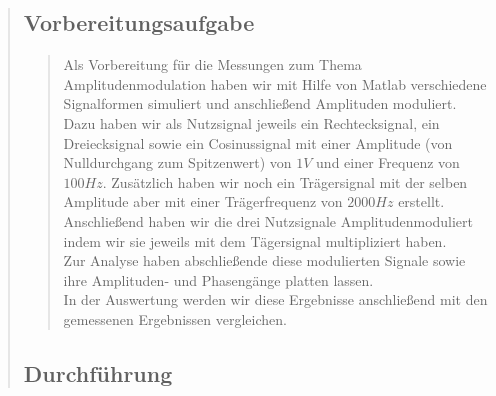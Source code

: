 \begin{quote}
\begin{quote}
\begin{quote}
		      
		\end{quote}
        
        
    \end{quote}
    
    \subsection{Vorbereitungsaufgabe}
    \begin{quote}
        Als Vorbereitung für die Messungen zum Thema Amplitudenmodulation haben wir mit Hilfe von Matlab verschiedene
        Signalformen simuliert und anschließend Amplituden moduliert.\\
        Dazu haben wir als Nutzsignal jeweils ein Rechtecksignal, ein Dreiecksignal sowie ein Cosinussignal mit
        einer Amplitude (von Nulldurchgang zum Spitzenwert) von $1V$ und einer Frequenz von $100 Hz$. Zusätzlich haben
        wir noch ein Trägersignal mit der selben Amplitude aber mit einer Trägerfrequenz von $2000 Hz$ erstellt.\\
        Anschließend haben wir die drei Nutzsignale Amplitudenmoduliert indem wir sie jeweils mit dem Tägersignal
        multipliziert haben.\\
        Zur Analyse haben abschließende diese modulierten Signale sowie ihre Amplituden- und Phasengänge platten
        lassen.\\
        In der Auswertung werden wir diese Ergebnisse anschließend mit den gemessenen Ergebnissen vergleichen.
    \end{quote}
    
    \subsection{Durchführung}
    \begin{quote}

\end{quote}
\end{quote}
